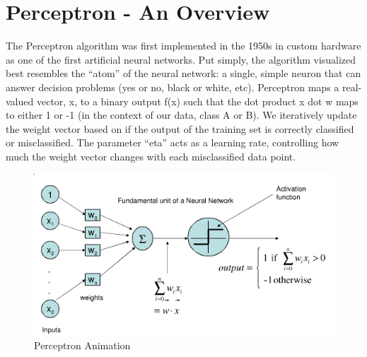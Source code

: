 \documentclass{article}
\begin{document}
 
\clearpage
\section{Perceptron - An Overview}
The Perceptron algorithm was first implemented in the 1950s in custom hardware as one of the first artificial neural networks. Put simply, the algorithm visualized best resembles the ``atom'' of the neural network: a single, simple neuron that can answer decision problems (yes or no, black or white, etc). Perceptron maps a real-valued vector, x, to a binary output f(x) such that the dot product x dot w maps to either 1 or -1 (in the context of our data, class A or B). We iteratively update the weight vector based on if the output of the training set is correctly classified or misclassified. The parameter ``eta'' acts as a learning rate, controlling how much the weight vector changes with each misclassified data point.

\begin{figure}[!htbp]
\begin{center}
\includegraphics[width=1.0\textwidth]{PerceptronAnimation} %
\caption{Perceptron Animation}
\end{center}
\end{figure}
\end{document}
